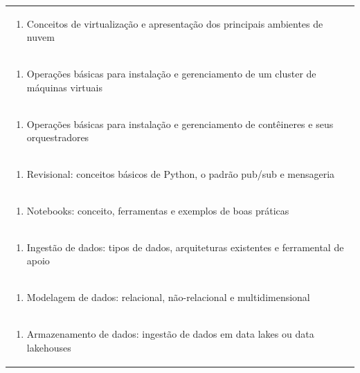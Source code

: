 \documentclass[11pt]{article}
\begin{document}
\begin{center}
\begin{longtable}{|p{4cm}|p{4cm}|p{4cm}|p{4cm}|}
\multicolumn{4}{|p{\dimexpr 16cm + 6\tabcolsep\relax}|}{\begin{enumerate}[start=2]\item Conceitos de virtualização e apresentação dos principais ambientes de nuvem\end{enumerate}}\\
\multicolumn{4}{|p{\dimexpr 16cm + 6\tabcolsep\relax}|}{\begin{enumerate}[start=3]\item Operações básicas para instalação e gerenciamento de um cluster de máquinas virtuais\end{enumerate}}\\
\multicolumn{4}{|p{\dimexpr 16cm + 6\tabcolsep\relax}|}{\begin{enumerate}[start=4]\item Operações básicas para instalação e gerenciamento de contêineres e seus orquestradores\end{enumerate}}\\
\multicolumn{4}{|p{\dimexpr 16cm + 6\tabcolsep\relax}|}{\begin{enumerate}[start=5]\item Revisional: conceitos básicos de Python, o padrão pub/sub e mensageria\end{enumerate}}\\
\multicolumn{4}{|p{\dimexpr 16cm + 6\tabcolsep\relax}|}{\begin{enumerate}[start=6]\item Notebooks: conceito, ferramentas e exemplos de boas práticas\end{enumerate}}\\
\multicolumn{4}{|p{\dimexpr 16cm + 6\tabcolsep\relax}|}{\begin{enumerate}[start=7]\item Ingestão de dados: tipos de dados, arquiteturas existentes e ferramental de apoio\end{enumerate}}\\
\multicolumn{4}{|p{\dimexpr 16cm + 6\tabcolsep\relax}|}{\begin{enumerate}[start=8]\item Modelagem de dados: relacional, não-relacional e multidimensional\end{enumerate}}\\
\multicolumn{4}{|p{\dimexpr 16cm + 6\tabcolsep\relax}|}{\begin{enumerate}[start=9]\item Armazenamento de dados: ingestão de dados em data lakes ou data lakehouses\end{enumerate}}\\

\end{longtable}
\end{center}
\end{document}
